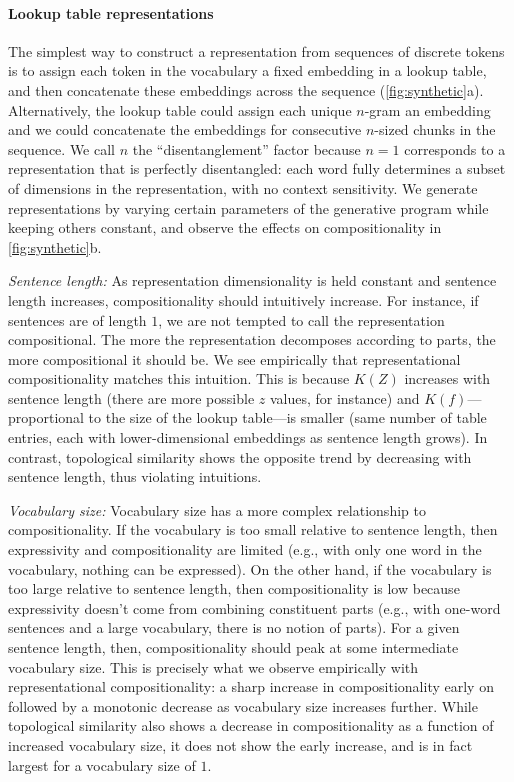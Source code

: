 \documentclass{article}
\newcommand{\comp}{representational compositionality}
\begin{document}
\paragraph{Lookup table representations}

The simplest way to construct a representation from sequences of discrete tokens is to assign each token in the vocabulary a fixed embedding in a lookup table, and then concatenate these embeddings across the sequence (\cref{fig:synthetic}a). Alternatively, the lookup table could assign each unique $n$-gram an embedding and we could concatenate the embeddings for consecutive $n$-sized chunks in the sequence. We call $n$ the ``disentanglement'' factor because $n=1$ corresponds to a representation that is perfectly disentangled: each word fully determines a subset of dimensions in the representation, with no context sensitivity. We generate representations by varying certain parameters of the generative program while keeping others constant, and observe the effects on compositionality in \cref{fig:synthetic}b.

\textit{Sentence length:} As representation dimensionality is held constant and sentence length increases, compositionality should intuitively increase. For instance, if sentences are of length $1$, we are not tempted to call the representation compositional. The more the representation decomposes according to parts, the more compositional it should be. We see empirically that \comp{} matches this intuition. This is because $K(Z)$ increases with sentence length (there are more possible $z$ values, for instance) and $K(f)$---proportional to the size of the lookup table---is smaller (same number of table entries, each with lower-dimensional embeddings as sentence length grows). In contrast, topological similarity shows the opposite trend by decreasing with sentence length, thus violating intuitions.

\textit{Vocabulary size:} Vocabulary size has a more complex relationship to compositionality. If the vocabulary is too small relative to sentence length, then expressivity and compositionality are limited (e.g., with only one word in the vocabulary, nothing can be expressed). On the other hand, if the vocabulary is too large relative to sentence length, then compositionality is low because expressivity doesn't come from combining constituent parts (e.g., with one-word sentences and a large vocabulary, there is no notion of parts). For a given sentence length, then, compositionality should peak at some intermediate vocabulary size. This is precisely what we observe empirically with \comp{}: a sharp increase in compositionality early on followed by a monotonic decrease as vocabulary size increases further. While topological similarity also shows a decrease in compositionality as a function of increased vocabulary size, it does not show the early increase, and is in fact largest for a vocabulary size of $1$.
\end{document}
